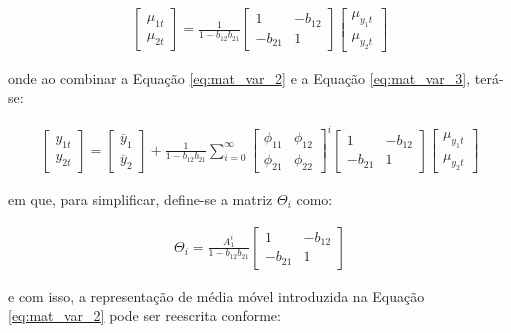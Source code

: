 \begin{ceqn}
\begin{align} \label{eq:mat_var_3}
\begin{bmatrix}
\mu_{1t} \\
\mu_{2t}
\end{bmatrix}
=
\frac{1}{1-b_{12}b_{21}} \begin{bmatrix} 1 & -b_{12} \\ -b_{21} & 1 \end{bmatrix}
\begin{bmatrix}
\mu_{y_{1}t} \\
\mu_{y_{2}t}
\end{bmatrix}
\end{align}
\end{ceqn} onde ao combinar a Equação \eqref{eq:mat_var_2} e a Equação \eqref{eq:mat_var_3}, terá-se:

\begin{ceqn}
\begin{align} \label{eq:mat_var_4}
\begin{bmatrix}
y_{1t} \\
y_{2t}
\end{bmatrix}
=
\begin{bmatrix}
\overline{y}_{1} \\
\overline{y}_{2}
\end{bmatrix}
+
\frac{1}{1-b_{12}b_{21}}
\sum_{i=0}^{\infty}{\begin{bmatrix} \phi_{11} & \phi_{12} \\ \phi_{21} & \phi_{22} \end{bmatrix}^i}
\begin{bmatrix} 1 & -b_{12} \\ -b_{21} & 1 \end{bmatrix}
\begin{bmatrix}
\mu_{y_{1}t} \\
\mu_{y_{2}t}
\end{bmatrix}
\end{align}
\end{ceqn} em que, para simplificar, define-se a matriz $\Theta_{i}$ como:

\begin{ceqn}
\begin{align} \label{eq:irf}
\Theta_{i} = \frac{A_{1}^i}{1-b_{12}b_{21}} \begin{bmatrix} 1 & -b_{12} \\ -b_{21} & 1 \end{bmatrix}
\end{align}
\end{ceqn} e com isso, a representação de média móvel introduzida na Equação \eqref{eq:mat_var_2} pode ser reescrita conforme:

